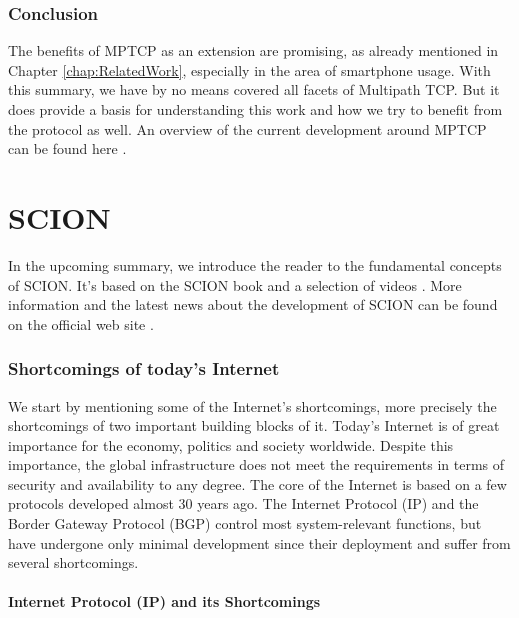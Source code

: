 \subsubsection{Conclusion}

The benefits of MPTCP as an extension are promising, as already mentioned in Chapter \ref{chap:RelatedWork}, especially in the area of smartphone usage.  With this summary, we have by no means covered all facets of Multipath TCP. But it does provide a basis for understanding this work and how we try to benefit from the protocol as well. An overview of the current development around MPTCP can be found here \cite{MPTCPWebMain}.

\section{SCION}
\label{sec:SCION}

In the upcoming summary, we introduce the reader to the fundamental concepts of SCION. It's based on the SCION book \cite{SCIONBook} and a selection of videos \cite{SCIONWebVideos}. More information and the latest news about the development of SCION can be found on the official web site \cite{SCIONWebMain}.

\subsubsection{Shortcomings of today's Internet}

We start by mentioning some of the Internet's shortcomings, more precisely the shortcomings of two important building blocks of it. Today's Internet is of great importance for the economy, politics and society worldwide. Despite this importance, the global infrastructure does not meet the requirements in terms of security and availability to any degree. The core of the Internet is based on a few protocols developed almost 30 years ago. The Internet Protocol (IP) and the Border Gateway Protocol (BGP) control most system-relevant functions, but have undergone only minimal development since their deployment and suffer from several shortcomings.

\paragraph{Internet Protocol (IP) and its Shortcomings}

